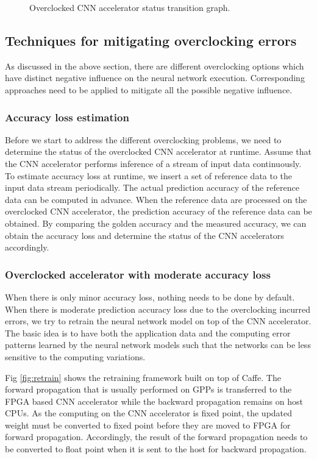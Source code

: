 \begin{figure}
    \caption{Overclocked CNN accelerator status transition graph.}
\label{fig:loss-estimation}
\vspace{-1em}
\end{figure}

\subsection{Techniques for mitigating overclocking errors}
As discussed in the above section, there are different overclocking 
options which have distinct negative influence on the neural network execution. 
Corresponding approaches need to be applied to mitigate all the possible 
negative influence. 

\subsubsection{Accuracy loss estimation}
Before we start to address the different overclocking problems, we need to 
determine the status of the overclocked CNN accelerator at runtime. 
Assume that the CNN accelerator performs inference of a stream of input data continuously.
To estimate accuracy loss at runtime, we insert a set of reference data to the 
input data stream periodically. The actual prediction 
accuracy of the reference data can be computed in advance. When the 
reference data are processed on the overclocked CNN accelerator, the 
prediction accuracy of the reference data can be obtained. By comparing the 
golden accuracy and the measured accuracy, we can obtain the accuracy loss and 
determine the status of the CNN accelerators accordingly.

\subsubsection{Overclocked accelerator with moderate accuracy loss}
When there is only minor accuracy loss, nothing needs to be done by default.
When there is moderate prediction accuracy loss due to the overclocking incurred errors, 
we try to retrain the neural network model on top of the CNN accelerator. 
The basic idea is to have both the application data and the computing error 
patterns learned by the neural network models such that the networks 
can be less sensitive to the computing variations. 

Fig \ref{fig:retrain} shows the retraining framework built on top of Caffe.
The forward propagation that is usually performed on GPPs is transferred to 
the FPGA based CNN accelerator while the backward propagation remains on 
host CPUs. As the computing on the CNN accelerator is fixed point, the updated 
weight must be converted to fixed point before they are moved to FPGA 
for forward propagation. Accordingly, the result of the forward propagation 
needs to be converted to float point when it is sent to the host for backward 
propagation.

